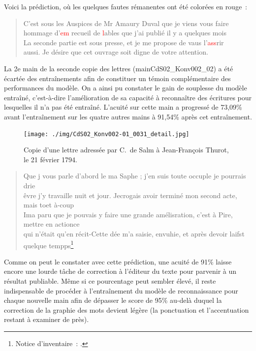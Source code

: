 \documentclass[a4paper,12pt,twoside]{book}
\begin{document}
				Voici la \gls{prédiction}, où les quelques fautes rémanentes ont été colorées en rouge~:
				
				\begin{quote}
					\textsf{C'est sous les Auspices de Mr Amaury Duval que je viens vous faire\\
					hommage d'\textcolor{red}{em} recueil de \textcolor{red}{l}ables que j'ai publié il y a quelques mois\\
					La seconde partie est sous presse, et je me propose de vaus l'\textcolor{red}{ass}rir\\
					aussi. Je désire que cet ouvrage soit digne de votre attention.}
				\end{quote}
							
				La 2e main de la seconde copie des lettres (\textsf{mainCdS02\_Konv002\_02}) a été écartée des entraînements afin de constituer un témoin complémentaire des performances du modèle. On a ainsi pu constater le gain de souplesse du modèle entraîné, c'est-à-dire l'amélioration de sa capacité à reconnaître des écritures pour lesquelles il n'a pas été entraîné. L'acuité sur cette main a progressé de 73,09\% avant l'entraînement sur les quatre autres mains à 91,54\% après cet entraînement.
				
				\begin{figure}[!h]
					\centering
					\texttt{[image: ./img/CdS02\_Konv002-01\_0031\_detail.jpg]}%
					\caption{Copie d'une lettre adressée par C.~de Salm à Jean-François Thurot, le 21 février 1794.}%
					\label{}%
				\end{figure}
				
				\begin{quote}
					\scriptsize \textsf{Que j vous parle d'abord le ma Saphe ; j'en suis toute occuple je pourrais drie\\
					êvre j'y travaille nuit et jour. Jecrogais avoir terminé mon second acte, mais toet à-coup\\
					Ima paru que je pouvais y faire une grande amélisration, c'est à Pire, mettre en actionce\\
					qui n'était qu'en récit-Cette dée m'a saisie, envuhie, et après devoir laifst quelque tempps}\footnote{Notice d'inventaire~: \cite{CdS02031032}.}
				\end{quote}
			
				Comme on peut le constater avec cette \gls{prédiction}, une acuité de 91\% laisse encore une lourde tâche de correction à l'éditeur du texte pour parvenir à un résultat publiable. Même si ce pourcentage peut sembler élevé, il reste indispensable de procéder à l'entraînement du modèle de reconnaissance pour chaque nouvelle main afin de dépasser le score de 95\% au-delà duquel la correction de la graphie des mots devient légère (la ponctuation et l'accentuation restant à examiner de près).
			
\end{document}

